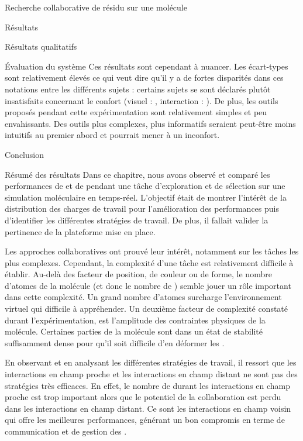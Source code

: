 \documentclass[myfrancais,ngerman,english,frenchb]{mythesis}
\begin{document}
\begin{mychapter}{Recherche collaborative de résidu sur une molécule}
\begin{mysection}{Résultats}
\begin{mysubsection}{Résultats qualitatifs}
\begin{mysubsubsection}{Évaluation du système}
					Ces résultats sont cependant à nuancer.
					Les écart-types sont relativement élevés ce qui veut dire qu'il y a de fortes disparités dans ces notations entre les différents sujets : certains sujets se sont déclarés plutôt insatisfaits concernant le confort (visuel : \mynum{2}, interaction : ).
					De plus, les outils proposés pendant cette expérimentation sont relativement simples et peu envahissants.
					Des outils plus complexes, plus informatifs seraient peut-être moins intuitifs au premier abord et pourrait mener à un inconfort.
				\end{mysubsubsection}
			\end{mysubsection}
		\end{mysection}
		\begin{mysection}{Conclusion}
			\begin{mysubsection}{Résumé des résultats}
				Dans ce chapitre, nous avons observé et comparé les performances de  et de  pendant une tâche d'exploration et de sélection sur une simulation moléculaire en temps-réel.
				L'objectif était de montrer l'intérêt de la distribution des charges de travail pour l'amélioration des performances puis d'identifier les différentes stratégies de travail.
				De plus, il fallait valider la pertinence de la plateforme mise en place.

				Les approches collaboratives ont prouvé leur intérêt, notamment sur les tâches les plus complexes.
				Cependant, la complexité d'une tâche est relativement difficile à établir.
				Au-delà des facteur de position, de couleur ou de forme, le nombre d'atomes de la molécule (et donc le nombre de ) semble jouer un rôle important dans cette complexité.
				Un grand nombre d'atomes surcharge l'environnement virtuel qui difficile à appréhender.
				Un deuxième facteur de complexité constaté durant l'expérimentation, est l'amplitude des contraintes physiques de la molécule.
				Certaines parties de la molécule sont dans un état de stabilité suffisamment dense pour qu'il soit difficile d'en déformer les .

				En observant et en analysant les différentes stratégies de travail, il ressort que les interactions en champ proche et les interactions en champ distant ne sont pas des stratégies très efficaces.
				En effet, le nombre de  durant les interactions en champ proche est trop important alors que le potentiel de la collaboration est perdu dans les interactions en champ distant.
				Ce sont les interactions en champ voisin qui offre les meilleures performances, générant un bon compromis en terme de communication et de gestion des .


\end{mysubsection}
\end{mysection}
\end{mychapter}
\end{document}
